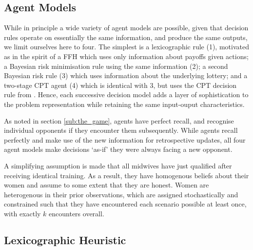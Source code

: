 \subsection{Agent Models}
\label{sub:the_agents}

While in principle a wide variety of agent models are possible, given that decision rules operate on essentially the same information, and produce the same outputs, we limit ourselves here to four. The simplest is a lexicographic rule (1), motivated as in the spirit of a \ac{FFH} \citep{Gigerenzer2004} which uses only information about payoffs given actions; a Bayesian risk minimisation rule using the same information (2); a second Bayesian risk rule (3) which uses information about the underlying lottery; and a two-stage \ac{CPT} \cite{Hau2008} agent (4) which is identical with 3, but uses the \ac{CPT} decision rule from \cite{Tversky1992}. Hence, each successive decision model adds a layer of sophistication to the problem representation while retaining the same input-ouput characteristics.

As noted in section \ref{sub:the_game}, agents have perfect recall, and recognise individual opponents if they encounter them subsequently. While agents recall perfectly and make use of the new information for retrospective updates, all four agent models make decisions `as-if' they were always facing a new opponent.

A simplifying assumption is made that all midwives have just qualified after receiving identical training. As a result, they have homogenous beliefs about their women and assume to some extent that they are honest.
Women are heterogenous in their prior observations, which are assigned stochastically and constrained such that they have encountered each scenario possible at least once, with exactly \(k\) encounters overall.


\subsection{Lexicographic Heuristic}
\label{sub:lexico}

